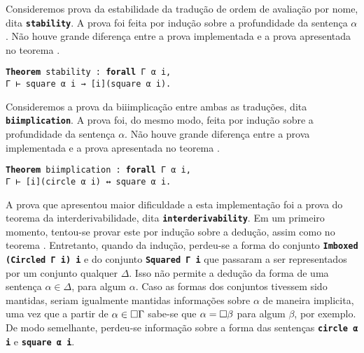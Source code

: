 \vspace{.5\baselineskip}
Consideremos prova da estabilidade da tradução de ordem de avaliação por nome, dita \texttt{\noindent\footnotesize\textbf{stability}}.
A prova foi feita por indução sobre a profundidade da sentença $\alpha$.
Não houve grande diferença entre a prova implementada e a prova apresentada no teorema .

\vspace{\baselineskip}
\begin{tcolorbox}[enhanced jigsaw, breakable, sharp corners, colframe=black, colback=white, boxrule=0.5pt, left=1.5mm, right=1.5mm, top=1.5mm, bottom=1.5mm]
\texttt{\noindent\footnotesize\textbf{Theorem} stability : \textbf{forall} Γ α i,\\Γ ⊢ square α i → [i](square α i).}
\end{tcolorbox}

\vspace{.5\baselineskip}
Consideremos a prova da biiimplicação entre ambas as traduções, dita \texttt{\noindent\footnotesize\textbf{biimplication}}.
A prova foi, do mesmo modo, feita por indução sobre a profundidade da sentença $\alpha$.
Não houve grande diferença entre a prova implementada e a prova apresentada no teorema .

\vspace{\baselineskip}
\begin{tcolorbox}[enhanced jigsaw, breakable, sharp corners, colframe=black, colback=white, boxrule=0.5pt, left=1.5mm, right=1.5mm, top=1.5mm, bottom=1.5mm]
\texttt{\noindent\footnotesize\textbf{Theorem} biimplication : \textbf{forall} Γ α i,\\Γ ⊢ [i](circle α i) ↔ square α i.}
\end{tcolorbox}

\vspace{.5\baselineskip}
A prova que apresentou maior dificuldade a esta implementação foi a prova do teorema da interderivabilidade, dita \texttt{\noindent\footnotesize\textbf{interderivability}}.
Em um primeiro momento, tentou-se provar este por indução sobre a dedução, assim como no teorema .
Entretanto, quando da indução, perdeu-se a forma do conjunto \texttt{\noindent\footnotesize\textbf{Imboxed (Circled Γ i) i}} e do conjunto \texttt{\noindent\footnotesize\textbf{Squared Γ i}} que passaram a ser representados por um conjunto qualquer $\Delta$.
Isso não permite a dedução da forma de uma sentença $\alpha\in\Delta$, para algum $\alpha$.
Caso as formas dos conjuntos tivessem sido mantidas, seriam igualmente mantidas informações sobre $\alpha$ de maneira implicita, uma vez que a partir de $\alpha\in\Box\Gamma$ sabe-se que $\alpha=\Box\beta$ para algum $\beta$, por exemplo.
De modo semelhante, perdeu-se informação sobre a forma das sentenças \texttt{\noindent\footnotesize\textbf{circle α i}} e \texttt{\noindent\footnotesize\textbf{square α i}}.

